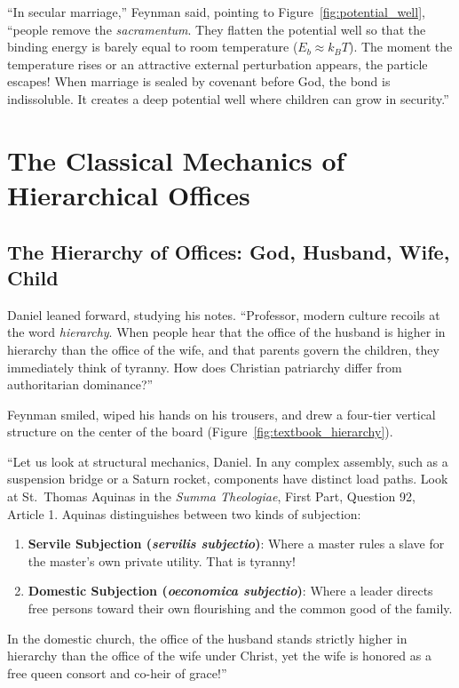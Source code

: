 \documentclass[11pt]{report}
\begin{document}
``In secular marriage,'' Feynman said, pointing to Figure~\ref{fig:potential_well}, ``people remove the \textit{sacramentum}. They flatten the potential well so that the binding energy is barely equal to room temperature ($E_b \approx k_B T$). The moment the temperature rises or an attractive external perturbation appears, the particle escapes! When marriage is sealed by covenant before God, the bond is indissoluble. It creates a deep potential well where children can grow in security.''

\chapter{The Classical Mechanics of Hierarchical Offices}

\section{The Hierarchy of Offices: God, Husband, Wife, Child}
Daniel leaned forward, studying his notes. ``Professor, modern culture recoils at the word \textit{hierarchy}. When people hear that the office of the husband is higher in hierarchy than the office of the wife, and that parents govern the children, they immediately think of tyranny. How does Christian patriarchy differ from authoritarian dominance?''

Feynman smiled, wiped his hands on his trousers, and drew a four-tier vertical structure on the center of the board (Figure~\ref{fig:textbook_hierarchy}).

``Let us look at structural mechanics, Daniel. In any complex assembly, such as a suspension bridge or a Saturn rocket, components have distinct load paths. Look at St.~Thomas Aquinas in the \textit{Summa Theologiae}, First Part, Question 92, Article 1. Aquinas distinguishes between two kinds of subjection:
\begin{enumerate}
    \item \textbf{Servile Subjection (\textit{servilis subjectio})}: Where a master rules a slave for the master's own private utility. That is tyranny!
    \item \textbf{Domestic Subjection (\textit{oeconomica subjectio})}: Where a leader directs free persons toward their own flourishing and the common good of the family.
\end{enumerate}
In the domestic church, the office of the husband stands strictly higher in hierarchy than the office of the wife under Christ, yet the wife is honored as a free queen consort and co-heir of grace!''
\end{document}
